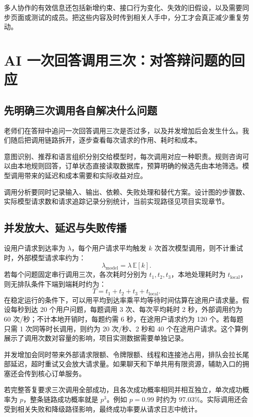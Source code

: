 多人协作的有效信息还包括新增约束、接口行为变化、失效的旧假设，以及需要同步页面或测试的成员。把这些内容及时传到相关人手中，分工才会真正减少重复劳动。
\section{AI 一次回答调用三次：对答辩问题的回应}
\subsection{先明确三次调用各自解决什么问题}
老师们在答辩中追问一次回答调用三次是否过多，以及并发增加后会发生什么。我们随后把调用链路拆开，逐步查看每次请求的作用、耗时和成本。

意图识别、推荐和语言组织分别交给模型时，每次调用对应一种职责。规则咨询可以由本地规则回答，订单状态直接读取数据库，预算明确的候选先由本地筛选。模型调用带来的延迟和成本需要和实际收益对应。

调用分析要同时记录输入、输出、依赖、失败处理和替代方案。设计图的步骤数、实际模型请求数和请求追踪记录分别统计，当前实现路径见项目实现章节。
\subsection{并发放大、延迟与失败传播}
设用户请求到达率为 $\lambda$，每个用户请求平均触发 $k$ 次首次模型调用，则不计重试时，外部模型请求率约为：
\[
\lambda_{\mathrm{model}}=\lambda\,\mathbb{E}[k].
\]
若每个问题固定串行调用三次，各次耗时分别为 $t_1,t_2,t_3$，本地处理耗时为 $t_{\mathrm{local}}$，则无排队条件下端到端耗时约为：
\[
T=t_1+t_2+t_3+t_{\mathrm{local}}.
\]
在稳定运行的条件下，可以用平均到达率乘平均等待时间估算在途用户请求量。假设每秒到达 20 个用户问题，每题调用 3 次、每次平均耗时 2 秒，外部调用约为 60 次/秒；不计本地开销时，每题约需 6 秒，在途用户请求约为 120 个。若每题只需 1 次同等时长调用，则约为 20 次/秒、2 秒和 40 个在途用户请求。这个算例展示了调用次数对容量的影响，项目实测数据需要单独记录。

并发增加会同时带来外部请求限额、令牌限额、线程和连接池占用，排队会拉长尾部延迟，超时重试又会放大请求量。如果聊天和下单共用有限资源，辅助入口的拥塞还会传到核心订单服务。

若完整答复要求三次调用全部成功，且各次成功概率相同并相互独立，单次成功概率为 $p$，整条链路成功概率就是 $p^3$。例如 $p=0.99$ 时约为 $97.03\%$。实际调用还会受到相关失败和降级路径影响，最终成功率要从请求日志中统计。

